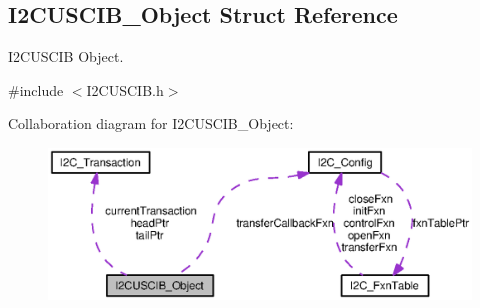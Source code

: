 \subsection{I2\+C\+U\+S\+C\+I\+B\+\_\+\+Object Struct Reference}
\label{struct_i2_c_u_s_c_i_b___object}


I2\+C\+U\+S\+C\+I\+B Object.  




{\ttfamily \#include $<$I2\+C\+U\+S\+C\+I\+B.\+h$>$}



Collaboration diagram for I2\+C\+U\+S\+C\+I\+B\+\_\+\+Object\+:
\nopagebreak
\begin{figure}[H]
\begin{center}
\leavevmode
\includegraphics[width=350pt]{struct_i2_c_u_s_c_i_b___object__coll__graph}
\end{center}
\end{figure}
